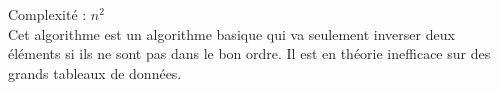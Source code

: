 \label{BubbleSort}
\footnotesize 
\noindent
Complexité :  $ n^2$
\\
\normalsize
Cet algorithme est un algorithme basique qui va seulement inverser deux éléments si ils ne sont pas dans le bon ordre. Il est en théorie inefficace sur des grands tableaux de données.